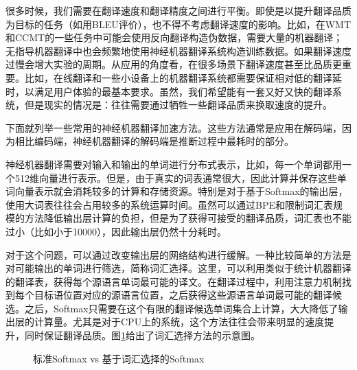 \parinterval 很多时候，我们需要在翻译速度和翻译精度之间进行平衡。即使是以提升翻译品质为目标的任务（如用BLEU评价），也不得不考虑翻译速度的影响。比如，在WMT和CCMT的一些任务中可能会使用反向翻译构造伪数据，需要大量的机器翻译；无指导机器翻译中也会频繁地使用神经机器翻译系统构造训练数据。如果翻译速度过慢会增大实验的周期。从应用的角度看，在很多场景下翻译速度甚至比品质更重要。比如，在线翻译和一些小设备上的机器翻译系统都需要保证相对低的翻译延时，以满足用户体验的最基本要求。虽然，我们希望能有一套又好又快的翻译系统，但是现实的情况是：往往需要通过牺牲一些翻译品质来换取速度的提升。

\parinterval 下面就列举一些常用的神经机器翻译加速方法。这些方法通常是应用在解码端，因为相比编码端，神经机器翻译的解码端是推断过程中最耗时的部分。

\vspace{0.5em}
\vspace{0.5em}

\parinterval 神经机器翻译需要对输入和输出的单词进行分布式表示，比如，每一个单词都用一个512维向量进行表示。但是，由于真实的词表通常很大，因此计算并保存这些单词向量表示就会消耗较多的计算和存储资源。特别是对于基于Softmax的输出层，使用大词表往往会占用较多的系统运算时间。虽然可以通过BPE和限制词汇表规模的方法降低输出层计算的负担，但是为了获得可接受的翻译品质，词汇表也不能过小（比如小于10000），因此输出层仍然十分耗时。

\parinterval 对于这个问题，可以通过改变输出层的网络结构进行缓解\cite{DBLP:conf/acl/JeanCMB15}。一种比较简单的方法是对可能输出的单词进行筛选，简称词汇选择。这里，可以利用类似于统计机器翻译的翻译表，获得每个源语言单词最可能的译文。在翻译过程中，利用注意力机制找到每个目标语位置对应的源语言位置，之后获得这些源语言单词最可能的翻译候选。之后，Softmax只需要在这个有限的翻译候选单词集合上计算，大大降低了输出层的计算量。尤其是对于CPU上的系统，这个方法往往会带来明显的速度提升，同时保证翻译品质。图\ref{fig:7-20}给出了词汇选择方法的示意图。

\begin{figure}[htp]
\centering

\caption{标准Softmax vs 基于词汇选择的Softmax}
\label{fig:7-20}
\end{figure}

\vspace{0.5em}
\vspace{0.5em}

